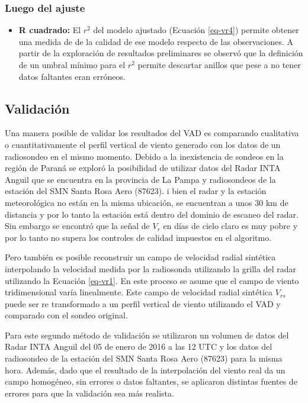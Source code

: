 \documentclass[12pt,spanish,oneside]{book}
\providecommand{\tightlist}{%
  \setlength{\itemsep}{0pt}\setlength{\parskip}{0pt}}
\begin{document}
\subsubsection{Luego del ajuste}\label{luego-del-ajuste}

\begin{itemize}
\tightlist
\item
  \textbf{R cuadrado:} El \(r^2\) del modelo ajustado (Ecuación
  \ref{eq-vr4}) permite obtener una medida de de la calidad de ese
  modelo respecto de las observaciones. A partir de la exploración de
  resultados preliminares se observó que la definición de un umbral
  mínimo para el \(r^2\) permite descartar anillos que pese a no tener
  datos faltantes eran erróneos.
\end{itemize}

\subsection{Validación}\label{validacion}

Una manera posible de validar los resultados del VAD es comparando
cualitativa o cuantitativamente el perfil vertical de viento generado
con los datos de un radiosondeo en el mismo momento. Debido a la
inexistencia de sondeos en la región de Paraná se exploró la posibilidad
de utilizar datos del Radar INTA Anguil que se encuentra en la provincia
de La Pampa y radiosondeos de la estación del SMN Santa Rosa Aero
(87623). i bien el radar y la estación meteorológica no están en la
misma ubicación, se encuentran a unos 30 km de distancia y por lo tanto
la estación está dentro del dominio de escaneo del radar. Sin embargo se
encontró que la señal de \(V_r\) en días de cielo claro es muy pobre y
por lo tanto no supera los controles de calidad impuestos en el
algoritmo.

Pero también es posible reconstruir un campo de velocidad radial
sintética interpolando la velocidad medida por la radiosonda utilizando
la grilla del radar utilizando la Ecuación \ref{eq-vr1}. En este proceso
se asume que el campo de viento tridimensional varía linealmente. Este
campo de velocidad radial sintética \(V_{rs}\) puede ser re transformado
a un perfil vertical de viento utilizando el VAD y comparado con el
sondeo original.

Para este segundo método de validación se utilizaron un volumen de datos
del Radar INTA Anguil del 05 de enero de 2016 a las 12 UTC y los datos
del radiosondeo de la estación del SMN Santa Rosa Aero (87623) para la
misma hora. Además, dado que el resultado de la interpolación del viento
real da un campo homogéneo, sin errores o datos faltantes, se aplicaron
distintas fuentes de errores para que la validación sea más realista.
\end{document}
